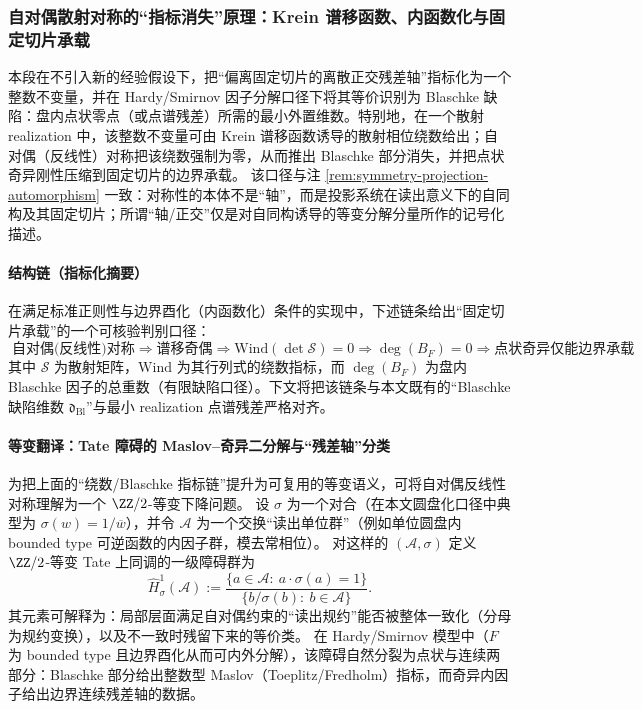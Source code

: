 \subsubsection{自对偶散射对称的“指标消失”原理：Krein 谱移函数、内函数化与固定切片承载}\label{subsubsec:selfdual-blaschke-defect-fixed-slice}
本段在不引入新的经验假设下，把“偏离固定切片的离散正交残差轴”指标化为一个整数不变量，并在 Hardy/Smirnov 因子分解口径下将其等价识别为 Blaschke 缺陷：盘内点状零点（或点谱残差）所需的最小外置维数。特别地，在一个散射 realization 中，该整数不变量可由 Krein 谱移函数诱导的散射相位绕数给出；自对偶（反线性）对称把该绕数强制为零，从而推出 Blaschke 部分消失，并把点状奇异刚性压缩到固定切片的边界承载。
该口径与注 \ref{rem:symmetry-projection-automorphism} 一致：对称性的本体不是“轴”，而是投影系统在读出意义下的自同构及其固定切片；所谓“轴/正交”仅是对自同构诱导的等变分解分量所作的记号化描述。

\paragraph{结构链（指标化摘要）}
在满足标准正则性与边界酉化（内函数化）条件的实现中，下述链条给出“固定切片承载”的一个可核验判别口径：
\[
\boxed{\;
\text{自对偶(反线性)对称}
\Rightarrow
\text{谱移奇偶}
\Rightarrow
\mathrm{Wind}(\det\mathcal S)=0
\Rightarrow
\deg(B_F)=0
\Rightarrow
\text{点状奇异仅能边界承载}\;}
\]
其中 \(\mathcal S\) 为散射矩阵，\(\mathrm{Wind}\) 为其行列式的绕数指标，而 \(\deg(B_F)\) 为盘内 Blaschke 因子的总重数（有限缺陷口径）。下文将把该链条与本文既有的“Blaschke 缺陷维数 \(\mathfrak d_{\mathrm{Bl}}\)”与最小 realization 点谱残差严格对齐。

\paragraph{等变翻译：Tate 障碍的 Maslov--奇异二分解与“残差轴”分类}\label{par:selfdual-tate-maslov-splitting}
为把上面的“绕数/Blaschke 指标链”提升为可复用的等变语义，可将自对偶反线性对称理解为一个 \(\ZZ/2\)-等变下降问题。
设 \(\sigma\) 为一个对合（在本文圆盘化口径中典型为 \(\sigma(w)=1/\overline w\)），并令 \(\mathcal{A}\) 为一个交换“读出单位群”（例如单位圆盘内 bounded type 可逆函数的内因子群，模去常相位）。
对这样的 \((\mathcal{A},\sigma)\) 定义 \(\ZZ/2\)-等变 Tate 上同调的一级障碍群为
\[
\widehat H^1_{\sigma}(\mathcal{A})
:=
\frac{\{a\in\mathcal{A}:\ a\cdot\sigma(a)=1\}}{\{b/\sigma(b):\ b\in\mathcal{A}\}}.
\]
其元素可解释为：局部层面满足自对偶约束的“读出规约”能否被整体一致化（分母为规约变换），以及不一致时残留下来的等价类。
在 Hardy/Smirnov 模型中（\(F\) 为 bounded type 且边界酉化从而可内外分解），该障碍自然分裂为点状与连续两部分：Blaschke 部分给出整数型 Maslov（Toeplitz/Fredholm）指标，而奇异内因子给出边界连续残差轴的数据。

